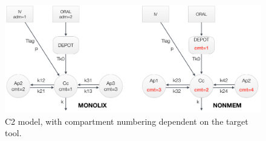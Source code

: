 \begin{figure}[htbp]
\centering
 \includegraphics[width=160mm]{pics/ComplexModel2}
\caption{C2 model, with compartment numbering dependent on the target tool.}
\label{fig:ComplexModel2}
\end{figure}


